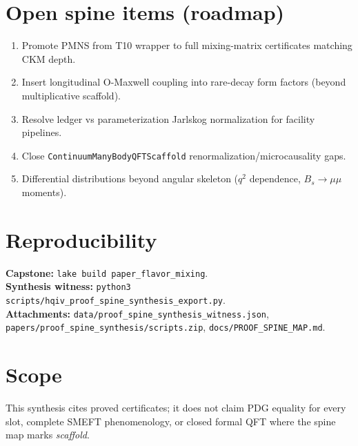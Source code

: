 \documentclass[11pt]{amsart}
\begin{document}
\section{Open spine items (roadmap)}
\begin{enumerate}
\item Promote PMNS from T10 wrapper to full mixing-matrix certificates matching CKM depth.
\item Insert longitudinal O-Maxwell coupling into rare-decay form factors (beyond multiplicative scaffold).
\item Resolve ledger vs parameterization Jarlskog normalization for facility pipelines.
\item Close \texttt{ContinuumManyBodyQFTScaffold} renormalization/microcausality gaps.
\item Differential distributions beyond angular skeleton ($q^2$ dependence, $B_s\to\mu\mu$ moments).
\end{enumerate}

\section{Reproducibility}
\textbf{Capstone:} \texttt{lake build paper\_flavor\_mixing}. \\
\textbf{Synthesis witness:} \texttt{python3 scripts/hqiv\_proof\_spine\_synthesis\_export.py}. \\
\textbf{Attachments:} \texttt{data/proof\_spine\_synthesis\_witness.json},
\texttt{papers/proof\_spine\_synthesis/scripts.zip},
\texttt{docs/PROOF\_SPINE\_MAP.md}.

\section*{Scope}
This synthesis cites proved certificates; it does not claim PDG equality for every slot,
complete SMEFT phenomenology, or closed formal QFT where the spine map marks \emph{scaffold}.



\end{document}
